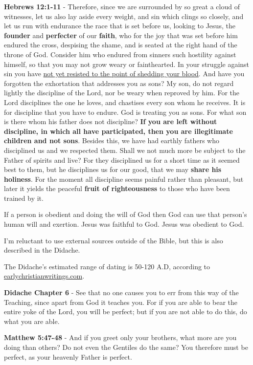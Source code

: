 \documentclass[11pt]{article}
\begin{document}
\textbf{Hebrews 12:1-11} - Therefore, since we are surrounded by so great a cloud of witnesses, let us also lay aside every weight, and sin which clings so closely, and let us run with endurance the race that is set before us, looking to Jesus, the \textbf{founder} and \textbf{perfecter} of our \textbf{faith}, who for the joy that was set before him endured the cross, despising the shame, and is seated at the right hand of the throne of God. Consider him who endured from sinners such hostility against himself, so that you may not grow weary or fainthearted. In your struggle against sin you have \uline{not yet resisted to the point of shedding your blood}. And have you forgotten the exhortation that addresses you as sons? My son, do not regard lightly the discipline of the Lord, nor be weary when reproved by him. For the Lord disciplines the one he loves, and chastises every son whom he receives. It is for discipline that you have to endure. God is treating you as sons. For what son is there whom his father does not discipline? \textbf{If you are left without discipline, in which all have participated, then you are illegitimate children and not sons}. Besides this, we have had earthly fathers who disciplined us and we respected them. Shall we not much more be subject to the Father of spirits and live? For they disciplined us for a short time as it seemed best to them, but he disciplines us for our good, that we may \textbf{share his holiness}. For the moment all discipline seems painful rather than pleasant, but later it yields the peaceful \textbf{fruit of righteousness} to those who have been trained by it.

If a person is obedient and doing the will of God then God can use that person's human will and exertion. Jesus was faithful to God. Jesus was obedient to God.

I'm reluctant to use external sources outside of the Bible, but this is also described in the Didache.

The Didache's estimated range of dating is 50-120 A.D, according to \href{https://www.earlychristianwritings.com/text/didache-roberts.html}{earlychristianwritings.com}.

\textbf{Didache Chapter 6} - See that no one causes you to err from this way of the Teaching, since apart from God it teaches you. For if you are able to bear the entire yoke of the Lord, you will be perfect; but if you are not able to do this, do what you are able.

\textbf{Matthew 5:47-48} - And if you greet only your brothers, what more are you doing than others? Do not even the Gentiles do the same? You therefore must be perfect, as your heavenly Father is perfect.
\end{document}
